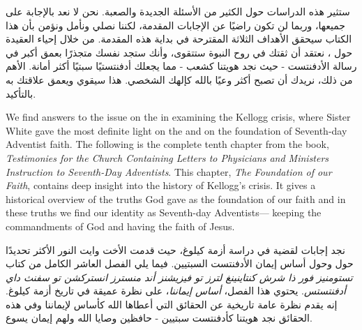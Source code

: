 ستثير هذه الدراسات حول  الكثير من الأسئلة الجديدة والصعبة. نحن لا نعد بالإجابة على جميعها، وربما لن تكون راضيًا عن الإجابات المقدمة، لكننا نصلي ونأمل ونؤمن بأن هذا الكتاب سيحقق الأهداف الثلاثة المقترحة في بداية هذه المقدمة. من خلال إحياء العقيدة حول ، نعتقد أن ثقتك في روح النبوة ستتقوى، وأنك ستجد نفسك متجذرًا بعمق أكبر في رسالة الأدفنتست - حيث نجد هويتنا كشعب - مما يجعلك أدفنتستيًا سبتيًا أكثر أمانة. الأهم من ذلك، نريدك أن تصبح أكثر وعيًا بالله كإلهك الشخصي. هذا سيقوي ويعمق علاقتك به بالتأكيد.


We find answers to the issue on the  in examining the Kellogg crisis, where Sister White gave the most definite light on the  and on the foundation of Seventh-day Adventist faith. The following is the complete tenth chapter from the book, \textit{Testimonies for the Church Containing Letters to Physicians and Ministers Instruction to Seventh-Day Adventists}. This chapter, \textit{The Foundation of our Faith}, contains deep insight into the history of Kellogg’s crisis. It gives a historical overview of the truths God gave as the foundation of our faith and in these truths we find our identity as Seventh-day Adventists— keeping the commandments of God and having the faith of Jesus.


نجد إجابات لقضية  في دراسة أزمة كيلوغ، حيث قدمت الأخت وايت النور الأكثر تحديدًا حول  وحول أساس إيمان الأدفنتست السبتيين. فيما يلي الفصل العاشر الكامل من كتاب \textit{تستومنيز فور ذا شرش كنتاينينغ لترز تو فيزيشنز أند منسترز انستركشن تو سفنث داي أدفنتستس}. يحتوي هذا الفصل، \textit{أساس إيماننا}، على نظرة عميقة في تاريخ أزمة كيلوغ. إنه يقدم نظرة عامة تاريخية عن الحقائق التي أعطاها الله كأساس لإيماننا وفي هذه الحقائق نجد هويتنا كأدفنتست سبتيين - حافظين وصايا الله ولهم إيمان يسوع.
